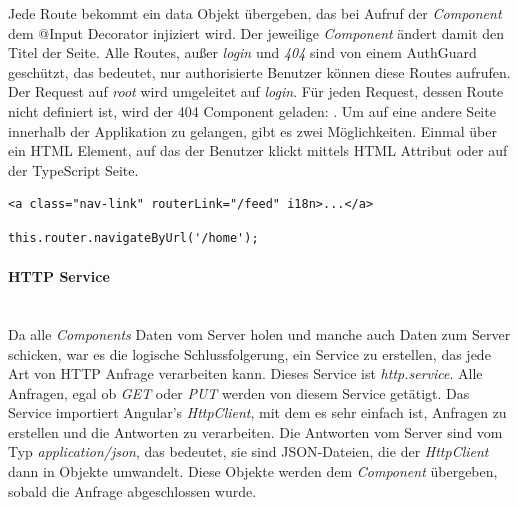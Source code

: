 Jede Route bekommt ein data Objekt übergeben, das bei Aufruf der \textit{Component} dem @Input Decorator injiziert wird. Der jeweilige \textit{Component} ändert damit den Titel der Seite. Alle Routes, außer \textit{login} und \textit{404} sind von einem AuthGuard geschützt, das bedeutet, nur authorisierte Benutzer können diese Routes aufrufen. Der Request auf \textit{root}  wird umgeleitet auf \textit{login}. Für jeden Request, dessen Route nicht definiert ist, wird der 404 Component geladen: . Um auf eine andere Seite innerhalb der Applikation zu gelangen, gibt es zwei Möglichkeiten. Einmal über ein \ac{HTML} Element, auf das der Benutzer klickt mittels \ac{HTML} Attribut  oder auf der TypeScript Seite.

\begin{lstlisting}[caption=Weiterleitung mittels \ac{HTML} Attributes,label=html-redirect,style=HTML]
<a class="nav-link" routerLink="/feed" i18n>...</a>
\end{lstlisting}

\begin{lstlisting}[caption=Weiterleiten mittels TypeScript,label=ts-redirect,style=TS]
this.router.navigateByUrl('/home');
\end{lstlisting}

\paragraph*{\ac{HTTP} Service}\mbox{}\\
Da alle \textit{Components} Daten vom Server holen und manche auch Daten zum Server schicken, war es die logische Schlussfolgerung, ein Service zu erstellen, das jede Art von \ac{HTTP} Anfrage verarbeiten kann. Dieses Service ist \textit{http.service}. Alle Anfragen, egal ob \textit{GET} oder \textit{PUT} werden von diesem Service getätigt. Das Service importiert Angular's \textit{HttpClient}, mit dem es sehr einfach ist, Anfragen zu erstellen und die Antworten zu verarbeiten. Die Antworten vom Server sind vom Typ \textit{application/json}, das bedeutet, sie sind \ac{JSON}-Dateien, die der \textit{HttpClient} dann in Objekte umwandelt. Diese Objekte werden dem \textit{Component} übergeben, sobald die Anfrage abgeschlossen wurde.

